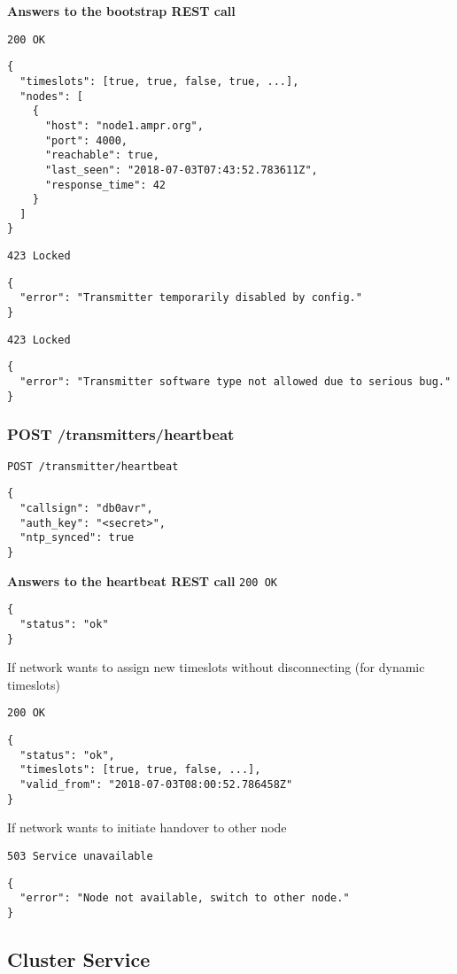 \textbf{Answers to the bootstrap REST call}

\texttt{200 OK}
\begin{lstlisting}
{
  "timeslots": [true, true, false, true, ...],
  "nodes": [
    {
      "host": "node1.ampr.org",
      "port": 4000,
      "reachable": true,
      "last_seen": "2018-07-03T07:43:52.783611Z",
      "response_time": 42
    }
  ]
}
\end{lstlisting}

\texttt{423 Locked}
\begin{lstlisting}
{
  "error": "Transmitter temporarily disabled by config."
}
\end{lstlisting}

\texttt{423 Locked}
\begin{lstlisting}
{
  "error": "Transmitter software type not allowed due to serious bug."
}
\end{lstlisting}


\subsubsection{POST /transmitters/heartbeat}
\texttt{POST /transmitter/heartbeat}
\begin{lstlisting}
{
  "callsign": "db0avr",
  "auth_key": "<secret>",
  "ntp_synced": true
}
\end{lstlisting}

\textbf{Answers to the heartbeat REST call}
\texttt{200 OK}
\begin{lstlisting}
{
  "status": "ok"
}
\end{lstlisting}

If network wants to assign new timeslots without disconnecting (for dynamic timeslots)

\texttt{200 OK}
\begin{lstlisting}
{
  "status": "ok",
  "timeslots": [true, true, false, ...],
  "valid_from": "2018-07-03T08:00:52.786458Z"
}
\end{lstlisting}

If network wants to initiate handover to other node

\texttt{503 Service unavailable}
\begin{lstlisting}
{
  "error": "Node not available, switch to other node."
}
\end{lstlisting}


\subsection{Cluster Service}

